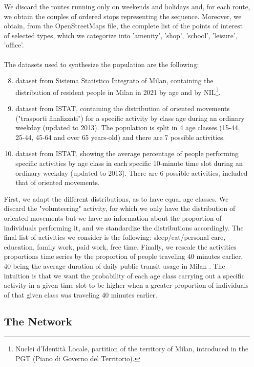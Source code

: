 We discard the routes running only on weekends and holidays and, for each route, we obtain the couples of ordered stops representing the sequence. Moreover, we obtain, from the OpenStreetMaps file, the complete list of the points of interest of selected types, which we categorize into 'amenity', 'shop', 'school', 'leisure', 'office'.\\\\
The datasets used to synthesize the population are the following:
\begin{enumerate}
\setcounter{enumi}{7}
    \item dataset \cite{site18} from Sistema Statistico Integrato of Milan, containing the distribution of resident people in Milan in 2021 by age and by NIL\footnote{Nuclei d'Identità Locale, partition of the territory of Milan, introduced in the PGT (Piano di Governo del Territorio).}.
    \item dataset \cite{site10} from ISTAT, containing the distribution of oriented movements ("trasporti finalizzati") for a specific activity by class age during an ordinary weekday (updated to 2013). The population is split in 4 age classes (15-44, 25-44, 45-64 and over 65 years-old) and there are 7 possible activities.
    \item dataset \cite{site11} from ISTAT, showing the average percentage of people performing specific activities by age class in each specific 10-minute time slot during an ordinary weekday (updated to 2013). There are 6 possible activities, included that of oriented movements.
\end{enumerate}
First, we adapt the different distributions, as to have equal age classes. We discard the "volunteering" activity, for which we only have the distribution of oriented movements but we have no information about the proportion of individuals performing it, and we standardize the distributions accordingly. The final list of activities we consider is the following: sleep/eat/personal care, education, family work, paid work, free time. Finally, we rescale the activities proportions time series by the proportion of people traveling 40 minutes earlier, 40 being the average duration of daily public transit usage in Milan \cite{bib2}. The intuition is that we want the probability of each age class carrying out a specific activity in a given time slot to be higher when a greater proportion of individuals of that given class was traveling 40 minutes earlier.

\subsection{The Network}\label{sec3}



